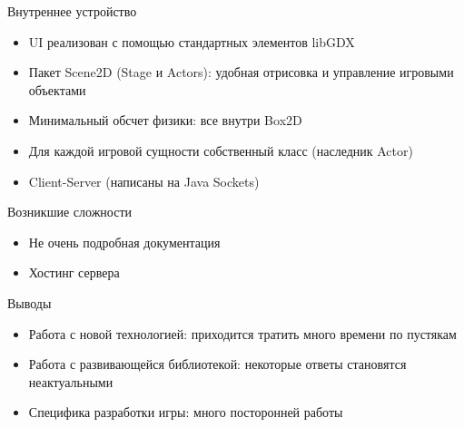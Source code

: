 \documentclass[12pt]{beamer}
\begin{document}
\begin{frame}{Внутреннее устройство}

    \begin{itemize}

        \item <1-> UI реализован с помощью стандартных элементов libGDX

        \item <2-> Пакет Scene2D (Stage и Actors): удобная отрисовка и управление игровыми объектами


        \item <3-> Минимальный обсчет физики: все внутри Box2D 
         
        \item <4-> Для каждой игровой сущности собственный класс (наследник Actor) 

        \item <5-> Client-Server (написаны на Java Sockets)

    \end{itemize}

\end{frame}

\begin{frame}{Возникшие сложности}

    \begin{itemize}

        \item <1-> Не очень подробная документация


        \item <2-> Хостинг сервера

    \end{itemize}

\end{frame}

\begin{frame}{Выводы}

    \begin{itemize}

        \item <1-> Работа с новой технологией: приходится тратить много времени по пустякам


        \item <2-> Работа с развивающейся библиотекой: некоторые ответы становятся неактуальными
        
        \item <3-> Специфика разработки игры: много посторонней работы


    \end{itemize}

\end{frame}    
\end{document}
